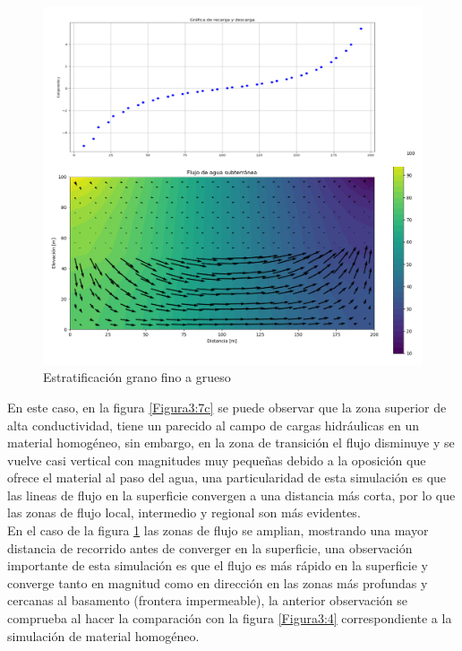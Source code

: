 \begin{figure}[H]
\centering
\includegraphics[scale=0.55]{Figura_34d.png}
\caption{ Estratificación grano fino a grueso}
\label{Figura3:7b}
\end{figure}


En este caso, en la figura \ref{Figura3:7c} se puede observar que la zona superior de alta conductividad, tiene un parecido al campo de cargas hidráulicas en un material homogéneo, sin embargo, en la zona de transición el flujo disminuye y se vuelve casi vertical con magnitudes muy pequeñas debido a la oposición que ofrece el material al paso del agua, una particularidad de esta simulación es que las lineas de flujo en la superficie convergen a una distancia más corta, por lo que las zonas de flujo local, intermedio y regional son más evidentes.
\\

En el caso de la figura \ref{Figura3:7b} las zonas de flujo  se amplian, mostrando una mayor distancia de recorrido antes de converger en la superficie, una observación importante de esta simulación es que el flujo es más rápido en la superficie y converge tanto en magnitud como en dirección en las zonas más profundas y cercanas al basamento (frontera impermeable), la anterior observación se comprueba al hacer la comparación con la figura  \ref{Figura3:4} correspondiente a la simulación de material homogéneo. 
\\

